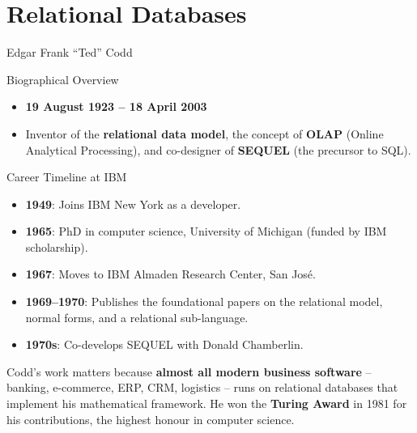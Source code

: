 \section{Relational Databases}

\begin{frame}{Edgar Frank ``Ted'' Codd}
  \begin{block}{Biographical Overview}
    \begin{itemize}
      \item \textbf{19 August 1923 -- 18 April 2003}
      \item Inventor of the \textbf{relational data model}, the concept of
            \textbf{OLAP} (Online Analytical Processing), and co-designer of
            \textbf{SEQUEL} (the precursor to SQL).
    \end{itemize}
  \end{block}

  \begin{block}{Career Timeline at IBM}
    \begin{itemize}
      \item \textbf{1949}: Joins IBM New York as a developer.
      \item \textbf{1965}: PhD in computer science, University of Michigan
            (funded by IBM scholarship).
      \item \textbf{1967}: Moves to IBM Almaden Research Center, San José.
      \item \textbf{1969--1970}: Publishes the foundational papers on the
            relational model, normal forms, and a relational sub-language.
      \item \textbf{1970s}: Co-develops SEQUEL with Donald Chamberlin.
    \end{itemize}
  \end{block}

  Codd's work matters because \textbf{almost all modern business software} --
  banking, e-commerce, ERP, CRM, logistics -- runs on relational databases
  that implement his mathematical framework.  He won the \textbf{Turing Award}
  in 1981 for his contributions, the highest honour in computer science.
\end{frame}

